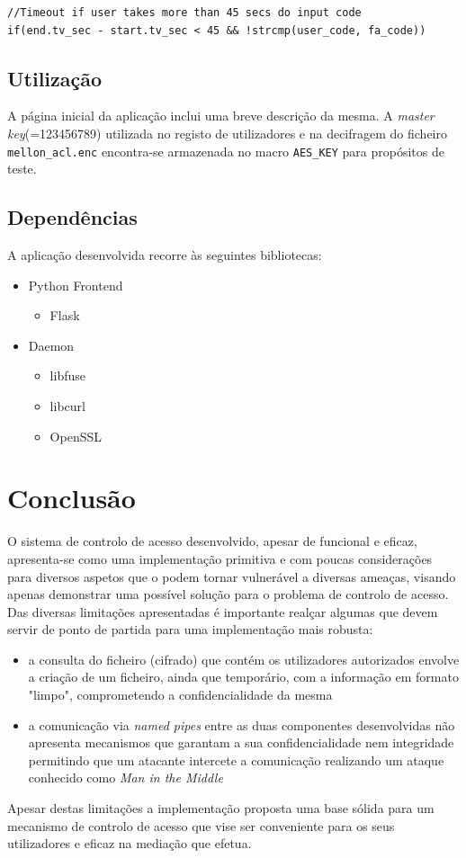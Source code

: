 \documentclass{article}
\begin{document}
\begin{Verbatim}
//Timeout if user takes more than 45 secs do input code
if(end.tv_sec - start.tv_sec < 45 && !strcmp(user_code, fa_code))
\end{Verbatim}

\subsection{Utilização}
A página inicial da aplicação inclui uma breve descrição da mesma.
A \textit{master key}(=123456789) utilizada no registo de utilizadores e na decifragem do ficheiro \texttt{mellon\_acl.enc} encontra-se
armazenada no macro \texttt{AES\_KEY} para propósitos de teste.

\subsection{Dependências}
A aplicação desenvolvida recorre às seguintes bibliotecas:
\begin{itemize}
    \item Python Frontend
    \begin{itemize}
        \item Flask
    \end{itemize}
    \item Daemon
    \begin{itemize}
        \item libfuse
        \item libcurl
        \item OpenSSL
    \end{itemize}
\end{itemize}

\section{Conclusão}
O sistema de controlo de acesso desenvolvido, apesar de funcional e eficaz, apresenta-se como uma implementação primitiva e 
com poucas considerações para diversos aspetos que o podem tornar vulnerável a diversas ameaças, visando apenas demonstrar 
uma possível solução para o problema de controlo de acesso.
Das diversas limitações apresentadas é importante realçar algumas que devem servir de ponto de partida para uma implementação mais 
robusta:
\begin{itemize}
    \item a consulta do ficheiro (cifrado) que contém os utilizadores autorizados envolve a criação de um ficheiro, ainda que temporário, 
    com a informação em formato "limpo", comprometendo a confidencialidade da mesma
    \item a comunicação via \textit{named pipes} entre as duas componentes desenvolvidas não apresenta mecanismos que garantam a sua 
    confidencialidade nem integridade permitindo que um atacante intercete a comunicação realizando um ataque conhecido como 
    \textit{Man in the Middle} 
\end{itemize}
Apesar destas limitações a implementação proposta uma base sólida para um mecanismo de controlo de acesso que vise ser conveniente para 
os seus utilizadores e eficaz na mediação que efetua.
\end{document}
